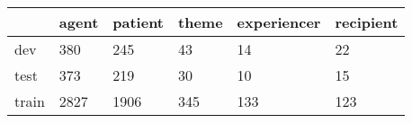 \begin{tabular}{llllll}
\toprule
{} & agent & patient & theme & experiencer & recipient \\
\midrule
dev   &   380 &     245 &    43 &          14 &        22 \\
test  &   373 &     219 &    30 &          10 &        15 \\
train &  2827 &    1906 &   345 &         133 &       123 \\
\bottomrule
\end{tabular}
